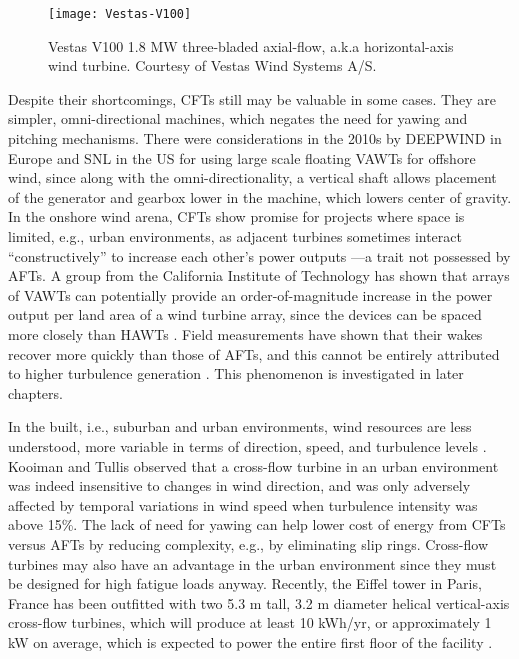 \begin{figure}
    \centering
    
    \texttt{[image: Vestas-V100]}
    
    \caption{Vestas V100 1.8 MW three-bladed axial-flow, a.k.a horizontal-axis
        wind turbine. Courtesy of Vestas Wind Systems A/S.}
    
    \label{fig:AFT}
\end{figure}

Despite their shortcomings, CFTs still may be valuable in some cases. They are
simpler, omni-directional machines, which negates the need for yawing and
pitching mechanisms. There were considerations in the 2010s by DEEPWIND in
Europe \cite{Paulsen2011} and SNL \cite{Sandia2012} in the US for using large
scale floating VAWTs for offshore wind, since along with the
omni-directionality, a vertical shaft allows placement of the generator and
gearbox lower in the machine, which lowers center of gravity. In the onshore
wind arena, CFTs show promise for projects where space is limited, e.g., urban
environments, as adjacent turbines sometimes interact ``constructively'' to
increase each other's power outputs \cite{Li2010}---a trait not possessed by
AFTs. A group from the California Institute of Technology has shown that arrays
of VAWTs can potentially provide an order-of-magnitude increase in the power
output per land area of a wind turbine array, since the devices can be spaced
more closely than HAWTs \cite{Dabiri2011}. Field measurements have shown that
their wakes recover more quickly than those of AFTs, and this cannot be entirely
attributed to higher turbulence generation \cite{Kinzel2012}. This phenomenon is
investigated in later chapters.

In the built, i.e., suburban and urban environments, wind resources are less
understood, more variable in terms of direction, speed, and turbulence levels
\cite{Smith2012}. Kooiman and Tullis \cite{Kooiman2010} observed that a
cross-flow turbine in an urban environment was indeed insensitive to changes in
wind direction, and was only adversely affected by temporal variations in wind
speed when turbulence intensity was above 15\%. The lack of need for yawing can
help lower cost of energy from CFTs versus AFTs by reducing complexity, e.g., by
eliminating slip rings. Cross-flow turbines may also have an advantage in the
urban environment since they must be designed for high fatigue loads anyway.
Recently, the Eiffel tower in Paris, France has been outfitted with two 5.3 m
tall, 3.2 m diameter helical vertical-axis cross-flow turbines, which will
produce at least 10 kWh/yr, or approximately 1 kW on average, which is expected
to power the entire first floor of the facility \cite{Lott2015}.

